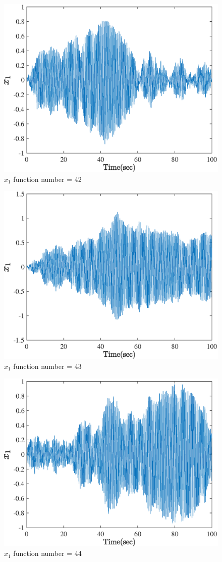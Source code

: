   \begin{figure}[H] 
  	\caption{$x_1$ function number = 42} 
  	\centering 
  	\includegraphics[width=12cm]{../Figure/Q5/part_a/42} 
  \end{figure}
  \begin{figure}[H] 
  	\caption{$x_1$ function number = 43} 
  	\centering 
  	\includegraphics[width=12cm]{../Figure/Q5/part_a/43} 
  \end{figure}
  \begin{figure}[H] 
  	\caption{$x_1$ function number = 44} 
  	\centering 
  	\includegraphics[width=12cm]{../Figure/Q5/part_a/44} 
  \end{figure}

